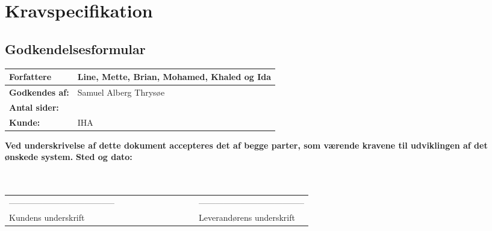 \chapter{Kravspecifikation}
\section{Godkendelsesformular}
\begin{table}[h!]
\label{tab:tabel2}
\begin{tabular}{| l | >{\raggedright\arraybackslash}p{12cm} |}
   \hline
   \textbf{Forfattere} & Line, Mette, Brian, Mohamed, Khaled og Ida\\ \hline
   \textbf{Godkendes af:} & Samuel Alberg Thrysøe\\ \hline
   \textbf{Antal sider:} & \\ \hline
   \textbf{Kunde:} & IHA\\ \hline
\end{tabular}
\end{table}
\textbf{Ved underskrivelse af dette dokument accepteres det af begge parter, som værende kravene til udviklingen af det ønskede system.}
\newline
\textbf{Sted og dato:}\\
\\
\\
\begin{table}
[h!]
\begin{tabular}{ l lllllllll l}
--------------------------------------&&&&&&&&&&--------------------------------------\\ 
Kundens underskrift &&&&&&&&&&Leverandørens underskrift\\
\end{tabular}
\end{table}
